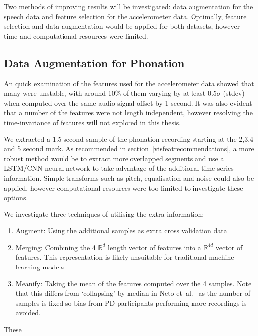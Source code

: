 \documentclass[12pt, twoside]{book}
\begin{document}
Two methods of improving results will be investigated: data augmentation for the speech data and feature selection for the accelerometer data. Optimally, feature selection and data augmentation would be applied for both datasets, however time and computational resources were limited.

\subsection{Data Augmentation for Phonation}
An quick examination of the features used for the accelerometer data showed that many were unstable, with around 10\% of them varying by at least $0.5\sigma$ (stdev) when computed over the same audio signal offset by 1 second. It was also evident that a number of the features were not length independent, however resolving the time-invariance of features will not explored in this thesis.

We extracted a 1.5 second sample of the phonation recording starting at the 2,3,4 and 5 second mark. As recommended in section~\ref{visfeatrecommendations}, a more robust method would be to extract more overlapped segments and use a LSTM/CNN neural network to take advantage of the additional time series information. Simple transforms such as pitch, equalisation and noise could also be applied, however computational resources were too limited to investigate these options. 


We investigate three techniques of utilising the extra information:
\begin{enumerate}
	\item Augment: Using the additional samples as extra cross validation data
	\item Merging: Combining the 4 $\mathbb{R}^d$ length vector of features into a $\mathbb{R}^{4d}$ vector of features. This representation is likely unsuitable for traditional machine learning models.
	\item Meanify: Taking the mean of the features computed over the 4 samples. Note that this differs from `collapsing' by median in Neto et~al.~\cite{mpowerneto2017analysis} as the number of samples is fixed so bias from PD participants performing more recordings is avoided. 
\end{enumerate}

These 
\end{document}
